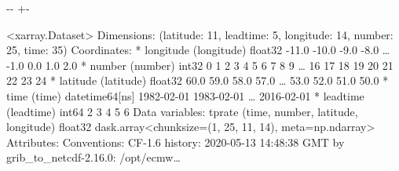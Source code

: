 \documentclass[letterpaper,10pt,english]{sphinxmanual}
\newlength\nbsphinxcodecellspacing
\begin{document}
{

\kern-\sphinxverbatimsmallskipamount\kern-\baselineskip
\kern+\FrameHeightAdjust\kern-\fboxrule
\vspace{\nbsphinxcodecellspacing}

\begin{sphinxVerbatim}[commandchars=\\\{\}]
\llap{\color{nbsphinxout}[10]:\,\hspace{\fboxrule}\hspace{\fboxsep}}<xarray.Dataset>
Dimensions:    (latitude: 11, leadtime: 5, longitude: 14, number: 25, time: 35)
Coordinates:
  * longitude  (longitude) float32 -11.0 -10.0 -9.0 -8.0 {\ldots} -1.0 0.0 1.0 2.0
  * number     (number) int32 0 1 2 3 4 5 6 7 8 9 {\ldots} 16 17 18 19 20 21 22 23 24
  * latitude   (latitude) float32 60.0 59.0 58.0 57.0 {\ldots} 53.0 52.0 51.0 50.0
  * time       (time) datetime64[ns] 1982-02-01 1983-02-01 {\ldots} 2016-02-01
  * leadtime   (leadtime) int64 2 3 4 5 6
Data variables:
    tprate     (time, number, latitude, longitude) float32 dask.array<chunksize=(1, 25, 11, 14), meta=np.ndarray>
Attributes:
    Conventions:  CF-1.6
    history:      2020-05-13 14:48:38 GMT by grib\_to\_netcdf-2.16.0: /opt/ecmw{\ldots}
\end{sphinxVerbatim}
}

{
\begin{sphinxVerbatim}[commandchars=\\\{\}]
\llap{\color{nbsphinxin}[ ]:\,\hspace{\fboxrule}\hspace{\fboxsep}}
\end{sphinxVerbatim}
}
\end{document}
